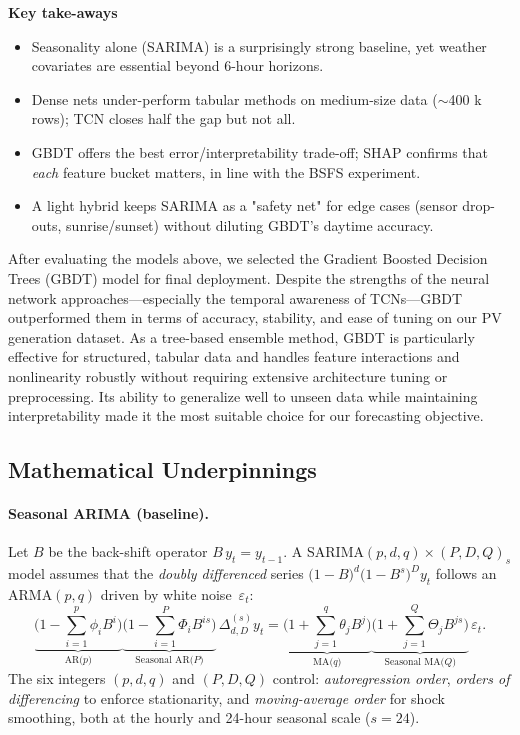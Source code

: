 \vspace{0.5em}
\noindent
\textbf{Key take-aways}  

\begin{itemize}[leftmargin=1.4em]
\item Seasonality alone (SARIMA) is a surprisingly strong baseline,
      yet weather covariates are essential beyond 6-hour horizons.
\item Dense nets under-perform tabular methods on medium-size data
      ($\sim$400 k rows); TCN closes half the gap but not all.
\item GBDT offers the best error/interpretability trade-off; SHAP
      confirms that \emph{each} feature bucket matters, in line with the
      BSFS experiment.
\item A light hybrid keeps SARIMA as a "safety net" for edge
      cases (sensor drop-outs, sunrise/sunset) without diluting GBDT's
      daytime accuracy.
\end{itemize}

After evaluating the models above, we selected the Gradient Boosted Decision 
Trees (GBDT) model for final deployment. Despite the strengths of the neural 
network approaches—especially the temporal awareness of TCNs—GBDT outperformed 
them in terms of accuracy, stability, and ease of tuning on our PV generation 
dataset. As a tree-based ensemble method, GBDT is particularly effective for 
structured, tabular data and handles feature interactions and nonlinearity 
robustly without requiring extensive architecture tuning or preprocessing. Its 
ability to generalize well to unseen data while maintaining interpretability made 
it the most suitable choice for our forecasting objective.

\subsection{Mathematical Underpinnings}
\label{subsec:math}

\paragraph{Seasonal ARIMA (baseline).}
Let $B$ be the back-shift operator $B\,y_t = y_{t-1}$.
A \textsf{SARIMA}$(p,d,q)\!\times\!(P,D,Q)_{s}$ model assumes that the
\emph{doubly differenced} series
$\bigl(1-B\bigr)^{d}\bigl(1-B^{s}\bigr)^{D}y_t$ follows an
\textsf{ARMA}$(p,q)$ driven by white noise~$\varepsilon_t$:
%
\[
\underbrace{\bigl(1-\sum_{i=1}^{p}\phi_i B^{i}\bigr)}_{\text{AR($p$)}}
\!
\underbrace{\bigl(1-\sum_{i=1}^{P}\Phi_i B^{is}\bigr)}_{\text{Seasonal AR($P$)}}
\,\Delta_{d,D}^{(s)} y_t
=
\underbrace{\bigl(1+\sum_{j=1}^{q}\theta_j B^{j}\bigr)}_{\text{MA($q$)}}
\!
\underbrace{\bigl(1+\sum_{j=1}^{Q}\Theta_j B^{js}\bigr)}_{\text{Seasonal MA($Q$)}}
\,\varepsilon_t.
\]
%
The six integers
$(p,d,q)$ and $(P,D,Q)$ control:
\emph{autoregression order}, \emph{orders of differencing} to enforce
stationarity, and \emph{moving-average order} for shock smoothing, both
at the hourly and 24-hour seasonal scale ($s=24$).

